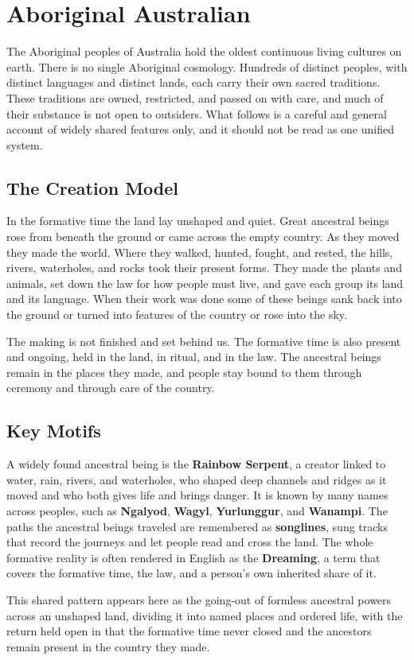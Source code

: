 \section{Aboriginal Australian}

The Aboriginal peoples of Australia hold the oldest continuous living cultures on earth. There is no single Aboriginal cosmology. Hundreds of distinct peoples, with distinct languages and distinct lands, each carry their own sacred traditions. These traditions are owned, restricted, and passed on with care, and much of their substance is not open to outsiders. What follows is a careful and general account of widely shared features only, and it should not be read as one unified system.

\subsection{The Creation Model}

In the formative time the land lay unshaped and quiet. Great ancestral beings rose from beneath the ground or came across the empty country. As they moved they made the world. Where they walked, hunted, fought, and rested, the hills, rivers, waterholes, and rocks took their present forms. They made the plants and animals, set down the law for how people must live, and gave each group its land and its language. When their work was done some of these beings sank back into the ground or turned into features of the country or rose into the sky.

The making is not finished and set behind us. The formative time is also present and ongoing, held in the land, in ritual, and in the law. The ancestral beings remain in the places they made, and people stay bound to them through ceremony and through care of the country.

\subsection{Key Motifs}

A widely found ancestral being is the \textbf{Rainbow Serpent}, a creator linked to water, rain, rivers, and waterholes, who shaped deep channels and ridges as it moved and who both gives life and brings danger. It is known by many names across peoples, such as \textbf{Ngalyod}, \textbf{Wagyl}, \textbf{Yurlunggur}, and \textbf{Wanampi}. The paths the ancestral beings traveled are remembered as \textbf{songlines}, sung tracks that record the journeys and let people read and cross the land. The whole formative reality is often rendered in English as the \textbf{Dreaming}, a term that covers the formative time, the law, and a person's own inherited share of it.

This shared pattern appears here as the going-out of formless ancestral powers across an unshaped land, dividing it into named places and ordered life, with the return held open in that the formative time never closed and the ancestors remain present in the country they made.
